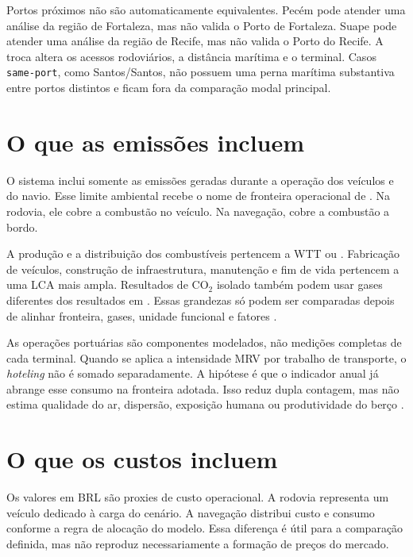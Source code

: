 Portos próximos não são automaticamente equivalentes. Pecém pode atender uma análise da região de Fortaleza, mas não valida o Porto de Fortaleza. Suape pode atender uma análise da região de Recife, mas não valida o Porto do Recife. A troca altera os acessos rodoviários, a distância marítima e o terminal. Casos \texttt{same-port}, como Santos/Santos, não possuem uma perna marítima substantiva entre portos distintos e ficam fora da comparação modal principal.

\section{O que as emissões incluem}
\label{sec:limitacao-ambiental}

O sistema inclui somente as emissões geradas durante a operação dos veículos e do navio. Esse limite ambiental recebe o nome de fronteira operacional \ttw{} de \cooe{}. Na rodovia, ele cobre a combustão no veículo. Na navegação, cobre a combustão a bordo.

A produção e a distribuição dos combustíveis pertencem a WTT ou \wtw{}. Fabricação de veículos, construção de infraestrutura, manutenção e fim de vida pertencem a uma LCA mais ampla. Resultados de CO$_2$ isolado também podem usar gases diferentes dos resultados em \cooe{}. Essas grandezas só podem ser comparadas depois de alinhar fronteira, gases, unidade funcional e fatores \cite{icct2022,decarb2024,maritimelca2024}.

As operações portuárias são componentes modelados, não medições completas de cada terminal. Quando se aplica a intensidade MRV por trabalho de transporte, o \emph{hoteling} não é somado separadamente. A hipótese é que o indicador anual já abrange esse consumo na fronteira adotada. Isso reduz dupla contagem, mas não estima qualidade do ar, dispersão, exposição humana ou produtividade do berço \cite{berth2009,shipops2022,berthairquality2010}.

\section{O que os custos incluem}
\label{sec:limitacao-economica}

Os valores em BRL são proxies de custo operacional. A rodovia representa um veículo dedicado à carga do cenário. A navegação distribui custo e consumo conforme a regra de alocação do modelo. Essa diferença é útil para a comparação definida, mas não reproduz necessariamente a formação de preços do mercado.

